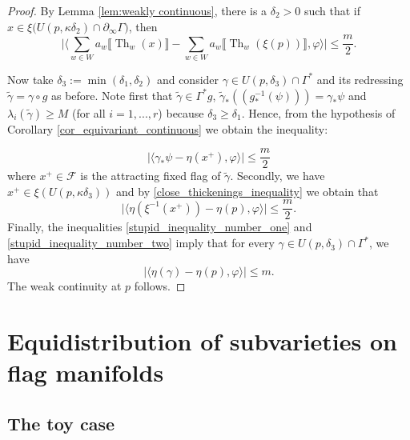 \documentclass[12pt]{amsbook}%
\theoremstyle{definition}
\theoremstyle{remark}
\numberwithin{section}{chapter}
\numberwithin{subsection}{section}
\numberwithin{figure}{chapter}
\DeclareMathOperator{\Th}{Th}
\def\cF{{\mathscr{F}}}
\def\tga{{\tilde{\gamma}}}
\def\ga{\gamma}
\def\geo{\partial_\infty}
\begin{document}
{{\begin{proof}
By Lemma \ref{lem:weakly continuous}, 
there is a $\delta_2>0$ such that if $x\in \xi\big(U(p,\kappa \delta_2)\cap \geo\Gamma\big)$, then 
\begin{equation}\label{close_thickenings_inequality}
\big\lvert\langle  \sum_{w\in W} a_w\llbracket\Th_{w}(x)\rrbracket - \sum_{w\in W} a_w \llbracket\Th_{w}(\xi(p))\rrbracket , \varphi \rangle \big\rvert \leqslant \frac{m}{2}.
\end{equation}




Now take $\delta_3:= \min(\delta_1,\delta_2)$ and consider $\gamma\in U(p,\delta_3)\cap \Gamma^*$ and its redressing $\tilde{\gamma} = \gamma \circ g$ as before. Note first that $\tga\in \Gamma^*g$, $\tga_*\left((g^{-1}_*(\psi))\right)=\ga_*\psi$ and $\lambda_i(\tga)\geqslant M$ (for all $i=1,...,r$) because $\delta_3\geqslant\delta_1$. Hence, 
 from the hypothesis of Corollary  \ref{cor_equivariant_continuous} we obtain 
  the inequality:
   
\begin{equation}
\label{stupid_inequality_number_one}
\big\lvert\langle \ga_*\psi - \eta(x^+), \varphi \rangle \big\rvert \leqslant \frac{m}{2}
\end{equation}
where $x^+\in \cF$ is the attracting fixed flag of $\tga$. Secondly, we have $x^+\in \xi (U(p,\kappa \delta_3))$ and by \eqref{close_thickenings_inequality} we obtain that 
\begin{equation}\label{stupid_inequality_number_two}
\lvert\langle  \eta(\xi^{-1}(x^+)) -\eta(p) , \varphi \rangle \rvert \leqslant \frac{m}{2}.
\end{equation} 
Finally, the inequalities \eqref{stupid_inequality_number_one} and \eqref{stupid_inequality_number_two} imply that for every $\gamma\in U(p,\delta_3)\cap \Gamma^*$, we have
\[
\lvert\langle   \eta(\gamma) -\eta(p) , \varphi \rangle \rvert \leqslant m.
\]
The weak continuity at $p$ follows.
\end{proof}








\chapter{Equidistribution of subvarieties on flag manifolds}\label{sec:Equidistribution of subvarieties}


\section{The toy case}\label{sec:toy}



}}
\end{document}
